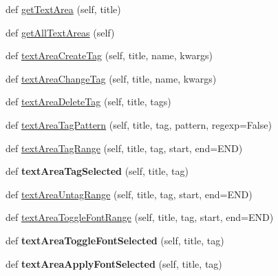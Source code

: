 \begin{DoxyCompactItemize}
\item 
def \hyperlink{class_python_01_g_u_i_1_1appjar_1_1gui_afa588273483617b683ef7fd0a75b117f}{get\+Text\+Area} (self, title)
\item 
def \hyperlink{class_python_01_g_u_i_1_1appjar_1_1gui_afe842566f0b718e7ceed8f0d98b1c302}{get\+All\+Text\+Areas} (self)
\item 
def \hyperlink{class_python_01_g_u_i_1_1appjar_1_1gui_abb0f4952e76c77dbf5ca2e7e10ffbfb9}{text\+Area\+Create\+Tag} (self, title, name, kwargs)
\item 
def \hyperlink{class_python_01_g_u_i_1_1appjar_1_1gui_a02cdc692f2161afd6fd93ef9ec5d0282}{text\+Area\+Change\+Tag} (self, title, name, kwargs)
\item 
def \hyperlink{class_python_01_g_u_i_1_1appjar_1_1gui_ae378601328627c5ae97b3863f4fab2f0}{text\+Area\+Delete\+Tag} (self, title, tags)
\item 
def \hyperlink{class_python_01_g_u_i_1_1appjar_1_1gui_a8689a0b557081aed3e01dfe9f8933d3c}{text\+Area\+Tag\+Pattern} (self, title, tag, pattern, regexp=False)
\item 
def \hyperlink{class_python_01_g_u_i_1_1appjar_1_1gui_a6e203fa26a8192d057596db2f072f73c}{text\+Area\+Tag\+Range} (self, title, tag, start, end=E\+ND)
\item 
\mbox{\label{class_python_01_g_u_i_1_1appjar_1_1gui_a9717805ebc3dd446b02c506daa13db60}} 
def {\bfseries text\+Area\+Tag\+Selected} (self, title, tag)
\item 
def \hyperlink{class_python_01_g_u_i_1_1appjar_1_1gui_a568d8cbcfaa3fe2472d9846f69f69aa5}{text\+Area\+Untag\+Range} (self, title, tag, start, end=E\+ND)
\item 
def \hyperlink{class_python_01_g_u_i_1_1appjar_1_1gui_a317514b32a1a036b58b257c84b809bc0}{text\+Area\+Toggle\+Font\+Range} (self, title, tag, start, end=E\+ND)
\item 
\mbox{\label{class_python_01_g_u_i_1_1appjar_1_1gui_ac41af778ee57a8fa331fea78e988c880}} 
def {\bfseries text\+Area\+Toggle\+Font\+Selected} (self, title, tag)
\item 
\mbox{\label{class_python_01_g_u_i_1_1appjar_1_1gui_ae181a3894c9f86cccb2cd535ee5242ea}} 
def {\bfseries text\+Area\+Apply\+Font\+Selected} (self, title, tag)
\item 

\end{DoxyCompactItemize}
